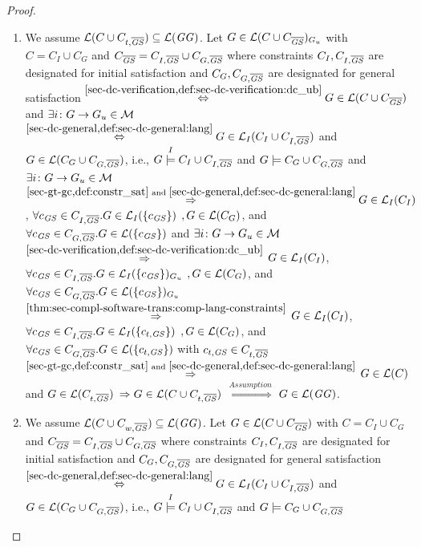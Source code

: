 \begin{proof}
\begin{enumerate}
  \item We assume $\mathcal{L}(C \cup C_{t,\overline{\mathit{GS}}}) \subseteq \mathcal{L}(\mathit{GG})$.
  Let $G \in \mathcal{L}(C \cup C_{\overline{\mathit{GS}}})_{G_u}$ with $C=C_I \cup C_G$ and $C_{\overline{\mathit{GS}}}=C_{I,\overline{\mathit{GS}}} \cup C_{G,\overline{\mathit{GS}}}$ where constraints $C_I,C_{I,\overline{\mathit{GS}}}$ are designated for initial satisfaction and $C_G,C_{G,\overline{\mathit{GS}}}$ are designated for general satisfaction
  $\stackrel{\cref{sec-dc-verification,def:sec-dc-verification:dc_ub}}{\Leftrightarrow} G \in \Lang(C \cup C_{\ol{\GS}})$ and $\exists i\colon G \to G_u \in {\cal M}$
  $\stackrel{\cref{sec-dc-general,def:sec-dc-general:lang}}{\Leftrightarrow} G \in \Lang_I(C_I \cup C_{I,\ol{\GS}})$ and $G \in \mathcal{L}(C_G \cup C_{G,\overline{\mathit{GS}}})$, i.e., $G \stackrel{I}{\models} C_I \cup C_{I,\overline{\mathit{GS}}}$ and $G \models C_G \cup C_{G,\overline{\mathit{GS}}}$ and $\exists i\colon G \to G_u \in {\cal M}$
  $\stackrel{\cref{sec-gt-gc,def:constr_sat}\text{ and }\cref{sec-dc-general,def:sec-dc-general:lang}}{\Rightarrow} G \in \Lang_I(C_I)$, $\forall c_\mathit{GS} \in C_{I,\overline{\mathit{GS}}}.G \in \mathcal{L}_I(\{c_\mathit{GS}\})$ $,G \in \mathcal{L}(C_G)$, and $\forall c_\mathit{GS} \in C_{G,\overline{\mathit{GS}}}.G \in \mathcal{L}(\{c_\mathit{GS}\})$ and $\exists i\colon G \to G_u \in {\cal M}$
  $\stackrel{\cref{sec-dc-verification,def:sec-dc-verification:dc_ub}}{\Rightarrow}$ $G \in \mathcal{L}_I(C_I)$, $\forall c_\mathit{GS} \in C_{I,\overline{\mathit{GS}}}.G \in \mathcal{L}_I(\{c_\mathit{GS}\})_{G_u}$ $,G \in \mathcal{L}(C_G)$, and $\forall c_\mathit{GS} \in C_{G,\overline{\mathit{GS}}}.G \in \mathcal{L}(\{c_\mathit{GS}\})_{G_u}$
  $\stackrel{\cref{thm:sec-compl-software-trans:comp-lang-constraints}}{\Rightarrow}$ $G \in \mathcal{L}_I(C_I)$, $\forall c_\mathit{GS} \in C_{I,\overline{\mathit{GS}}}.G \in \mathcal{L}_I(\{c_{t,\mathit{GS}}\})$ $,G \in \mathcal{L}(C_G)$, and $\forall c_\mathit{GS} \in C_{G,\overline{\mathit{GS}}}.G \in \mathcal{L}(\{c_{t,\mathit{GS}}\})$ with $c_{t,\mathit{GS}} \in C_{t,\overline{\mathit{GS}}}$
  $\stackrel{\cref{sec-gt-gc,def:constr_sat}\text{ and }\cref{sec-dc-general,def:sec-dc-general:lang}}{\Rightarrow}$ $G \in \mathcal{L}(C)$ and $G \in \mathcal{L}(C_{t,\overline{\mathit{GS}}})$
  $\Rightarrow G \in \mathcal{L}(C \cup C_{t,\overline{\mathit{GS}}})$
  $\stackrel{Assumption}{\Rightarrow}$ $G \in \mathcal{L}(\mathit{GG})$.
  \item We assume $\mathcal{L}(C \cup C_{w,\overline{\mathit{GS}}}) \subseteq \mathcal{L}(\mathit{GG})$.
  Let $G \in \mathcal{L}(C \cup C_{\overline{\mathit{GS}}})$ with $C=C_I \cup C_G$ and $C_{\overline{\mathit{GS}}}=C_{I,\overline{\mathit{GS}}} \cup C_{G,\overline{\mathit{GS}}}$ where constraints $C_I,C_{I,\overline{\mathit{GS}}}$ are designated for initial satisfaction and $C_G,C_{G,\overline{\mathit{GS}}}$ are designated for general satisfaction
  $\stackrel{\cref{sec-dc-general,def:sec-dc-general:lang}}{\Leftrightarrow} G \in \Lang_I(C_I \cup C_{I,\ol{\GS}})$ and $G \in \mathcal{L}(C_G \cup C_{G,\overline{\mathit{GS}}})$, i.e., $G \stackrel{I}{\models} C_I \cup C_{I,\overline{\mathit{GS}}}$ and $G \models C_G \cup C_{G,\overline{\mathit{GS}}}$

\end{enumerate}
\end{proof}
